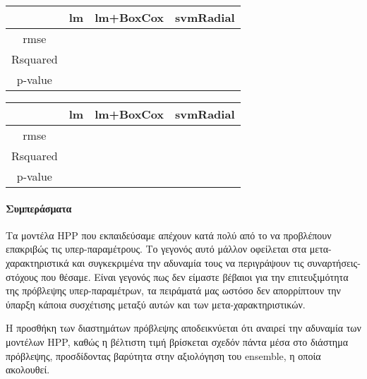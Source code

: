 \begin{minipage}{0.48\linewidth}
		\noindent
		\begin{center}
				\begin{tabular}{ |c|c|c|c| } 
					\hline
					& lm & lm+BoxCox & svmRadial\\
					\hline
					rmse & & &\\
					\hline
					Rsquared & & & \\
					\hline 
					p-value & & &\\				
					\hline
				\end{tabular}   
		\end{center}
\end{minipage} \qquad
\begin{minipage}{0.48\linewidth}
\end{minipage}

\begin{minipage}{0.48\linewidth}
	\noindent
	\begin{center}
		\begin{tabular}{ |c|c|c|c| } 
			\hline
			& lm & lm+BoxCox & svmRadial\\
			\hline
			rmse & & &\\
			\hline
			Rsquared & & & \\
			\hline 
			p-value & & &\\				
			\hline
		\end{tabular}   
	\end{center}
\end{minipage} \qquad
\begin{minipage}{0.48\linewidth}
\end{minipage}
\paragraph{Συμπεράσματα}
Τα μοντέλα HPP που εκπαιδεύσαμε απέχουν κατά πολύ από το να προβλέπουν επακριβώς τις υπερ-παραμέτρους. Το γεγονός αυτό μάλλον οφείλεται στα μετα-χαρακτη\-ρι\-στικά και συγκεκριμένα την αδυναμία τους να περιγράψουν τις συναρτήσεις-στόχους που θέσαμε. Είναι γεγονός πως δεν είμαστε βέβαιοι για την επιτευξιμότητα της πρόβλεψης υπερ-παραμέτρων, τα πειράματά μας ωστόσο δεν απορρίπτουν την ύπαρξη κάποια συσχέτισης μεταξύ αυτών και των μετα-χαρακτηριστικών.

Η προσθήκη των διαστημάτων πρόβλεψης αποδεικνύεται ότι αναιρεί την αδυναμία των μοντέλων HPP, καθώς η βέλτιστη τιμή βρίσκεται σχεδόν πάντα μέσα στο διάστημα πρόβλεψης, προσδίδοντας βαρύτητα στην αξιολόγηση του ensemble, η οποία ακολουθεί.  
